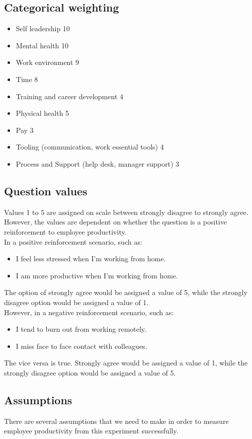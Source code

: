 \documentclass[12pt]{article}
\begin{document}
\subsection*{Categorical weighting}
\begin{itemize}
  \item Self leadership 10
  \item Mental health 10
  \item Work environment 9
  \item Time 8
  \item Training and career development 4
  \item Physical health 5
  \item Pay 3
  \item Tooling (communication, work essential tools) 4 
  \item Process and Support (help desk, manager support) 3
\end{itemize}

\subsection*{Question values}
Values 1 to 5 are assigned on scale between strongly disagree to strongly agree. However, the values are dependent on whether the question is a positive reinforcement to employee productivity. \\
In a positive reinforcement scenario, such as: 
\begin{itemize}
  \item I feel less stressed when I’m working from home. 
  \item I am more productive when I’m working from home. 
\end{itemize}
The option of strongly agree would be assigned a value of 5, while the strongly disagree option would be assigned a value of 1. \\
However, in a negative reinforcement scenario, such as: 
\begin{itemize}
  \item I tend to burn out from working remotely.
  \item I miss face to face contact with colleagues.
\end{itemize}
The vice versa is true. Strongly agree would be assigned a value of 1, while the strongly disagree option would be assigned a value of 5.

\subsection*{Assumptions}
There are several assumptions that we need to make in order to measure employee productivity from this experiment successfully.
\end{document}
